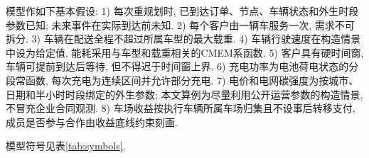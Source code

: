 模型作如下基本假设:
1) 每次重规划时, 已到达订单、节点、车辆状态和外生时段参数已知;
未来事件在实际到达前未知.
2) 每个客户由一辆车服务一次, 需求不可拆分.
3) 车辆在配送全程不超过所属车型的最大载重.
4) 车辆行驶速度在构造情景中设为给定值,
能耗采用与车型和载重相关的CMEM系函数\cite{ref:27,ref:36}.
5) 客户具有硬时间窗, 车辆可提前到达后等待, 但不得迟于时间窗上界.
6) 充电功率为电池荷电状态的分段常函数,
每次充电为连续区间并允许部分充电.
7) 电价和电网碳强度为按城市、日期和半小时时段绑定的外生参数;
本文算例为尽量利用公开运营参数的构造情景, 不冒充企业合同观测.
8) 车场收益按执行车辆所属车场归集且不设事后转移支付,
成员是否参与合作由收益底线约束刻画.

模型符号见表\ref{tab:symbols}.
